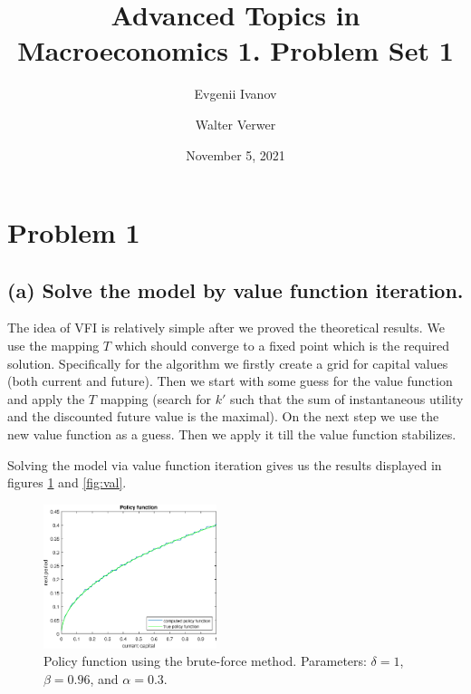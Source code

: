\documentclass[12pt]{article}
\newcommand{\?}{\stackrel{?}{=}}
\begin{document}
\title{\vspace{-1.5cm} Advanced Topics in Macroeconomics 1. Problem Set 1}
\author{Evgenii Ivanov \and Walter Verwer}
\date{November 5, 2021}
 
\maketitle

\section*{Problem 1}

\subsection*{(a) Solve the model by value function iteration.}

The idea of VFI is relatively simple after we proved the theoretical results. We use the mapping $T$ which should converge to a fixed point which is the required solution. Specifically for the algorithm we firstly create a grid for capital values (both current and future). Then we start with some guess for the value function and apply the $T$ mapping (search for $k'$ such that the sum of instantaneous utility and the discounted future value is the maximal). On the next step we use the new value function as a guess. Then we apply it till the value function stabilizes.

Solving the model via value function iteration gives us the results displayed in figures \ref{fig:pol} and \ref{fig:val}.
\begin{figure}[htbp!]
    \centering
    \includegraphics[width=0.45\textwidth]{PS1/1_Policy_Function_without.eps}
    \caption{Policy function using the brute-force method. Parameters: $\delta=1$, $\beta=0.96$, and $\alpha=0.3$.}
    \label{fig:pol}
\end{figure}
\end{document}
